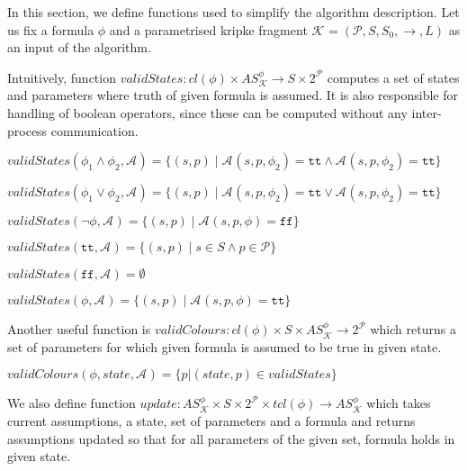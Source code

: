 \documentclass[12pt,oneside,draft]{fithesis2}
\newcommand{\as}[1][]{\ensuremath{\mathcal{A}_{#1}}}
\newcommand{\ASphi}{\ensuremath{AS_{\mathcal K}^\phi}}
\newcommand{\true}{\ensuremath{\texttt{tt}}}
\newcommand{\false}{\ensuremath{\texttt{ff}}}
\newcommand{\ks}[1][]{\ensuremath{\mathcal{K}_{#1}}}
\newcommand{\fullKs}{\ensuremath{ \ks = (\params, S, S_0, \trans{}, L) }}
\newcommand{\trans}[1]{\stackrel{#1}{\rightarrow}}
\newcommand{\params}{\mathcal{P}}
\begin{document}
    		In this section, we define functions used to simplify the algorithm description. Let us fix a formula $\phi$ and a parametrised kripke fragment $\fullKs$ as an input of the algorithm.
			
			Intuitively, function $validStates : cl(\phi) \times \ASphi \rightarrow S \times 2^\mathcal{P} $ computes a set of states and parameters where truth of given formula is assumed. It is also responsible for handling of boolean operators, since these can be computed without any inter-process communication. 
			
			\begin{center}
				$validStates(\phi_1 \wedge \phi_2, \as) = \{ (s, p) \mid \as(s, p, \phi_2) = \true \wedge \as(s, p, \phi_2) = \true \} $
			\end{center}
			
			\begin{center}
				$validStates(\phi_1 \vee \phi_2, \as) = \{ (s, p) \mid \as(s, p, \phi_2) = \true \vee \as(s, p, \phi_2) = \true \} $
			\end{center}
			
			\begin{center}
				$validStates(\neg\phi, \as) = \{ (s, p) \mid \as(s, p, \phi) = \false \} $
			\end{center}
			
			\begin{center}
				$validStates(\true, \as) = \{ (s, p) \mid s \in S \wedge p \in \params \} $
			\end{center}

			\begin{center}
				$validStates(\false, \as) = \emptyset $
			\end{center}
						
			\begin{center}
				$validStates(\phi, \as) = \{ (s, p) \mid \as(s, p, \phi) = \true \} $
			\end{center}

			Another useful function is $validColours : cl(\phi) \times S \times \ASphi \rightarrow 2^\mathcal{P}	$ which returns a set of parameters for which given formula is assumed to be true in given state. 
			
			\begin{center}
				$validColours(\phi, state, \as) = \{ p | (state, p) \in validStates \}$
			\end{center}
			
			We also define function $update: \ASphi \times S \times 2^{\params} \times tcl(\phi) \rightarrow \ASphi $ which takes current assumptions, a state, set of parameters and a formula and returns assumptions updated so that for all parameters of the given set, formula holds in given state.
			
\end{document}
